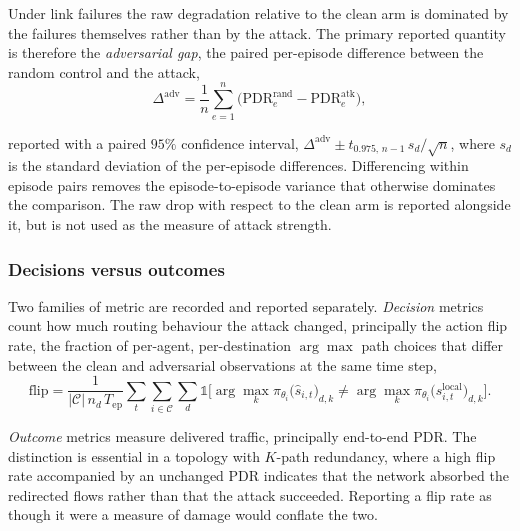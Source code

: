 Under link failures the raw degradation relative to the clean arm is dominated by
the failures themselves rather than by the attack. The primary reported quantity is
therefore the \emph{adversarial gap}, the paired per-episode difference between the
random control and the attack,
\begin{equation}
  \Delta^{\text{adv}} = \frac{1}{n} \sum_{e=1}^{n}
    \Big( \mathrm{PDR}^{\text{rand}}_{e} - \mathrm{PDR}^{\text{atk}}_{e} \Big),
  \label{eq:adversarial_gap}
\end{equation}

\noindent reported with a paired $95\%$ confidence interval,
$\Delta^{\text{adv}} \pm t_{0.975,\,n-1}\, s_d / \sqrt{n}$, where $s_d$ is the
standard deviation of the per-episode differences. Differencing within episode pairs
removes the episode-to-episode variance that otherwise dominates the comparison. The
raw drop with respect to the clean arm is reported alongside it, but is not used as
the measure of attack strength.

\subsubsection*{Decisions versus outcomes}

Two families of metric are recorded and reported separately. \emph{Decision} metrics
count how much routing behaviour the attack changed, principally the action flip
rate, the fraction of per-agent, per-destination $\arg\max$ path choices that differ
between the clean and adversarial observations at the same time step,
\begin{equation}
  \mathrm{flip}
  = \frac{1}{|\mathcal{C}|\, n_d\, T_{\text{ep}}}
    \sum_{t}\sum_{i \in \mathcal{C}}\sum_{d}
    \mathbb{1}\Big[
      \arg\max_k \pi_{\theta_i}\big(\hat{s}_{i,t}\big)_{d,k}
      \neq
      \arg\max_k \pi_{\theta_i}\big(s_{i,t}^{\text{local}}\big)_{d,k}
    \Big].
  \label{eq:flip_rate}
\end{equation}

\emph{Outcome} metrics measure delivered traffic, principally end-to-end PDR. The
distinction is essential in a topology with $K$-path redundancy, where a high flip
rate accompanied by an unchanged PDR indicates that the network absorbed the
redirected flows rather than that the attack succeeded. Reporting a flip rate as
though it were a measure of damage would conflate the two.
